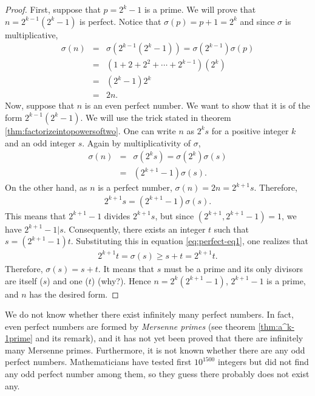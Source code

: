 \documentclass[12pt]{subfile}
\begin{document}
	\begin{proof}
		First, suppose that $p=2^k-1$ is a prime. We will prove that $n=2^{k-1}(2^k-1)$ is perfect. Notice that $\sigma(p)=p+1=2^k$ and since $\sigma$ is multiplicative,
		\begin{eqnarray*}
			\sigma(n) &=& \sigma\left(2^{k-1}(2^k-1)\right) = \sigma(2^{k-1}) \sigma(p)\\
					  &=& \left(1+2+2^2+\cdots+2^{k-1}\right) \left(2^k\right)\\
					  &=& \left(2^k-1\right) 2^k\\
					  &=& 2n.
		\end{eqnarray*}
		Now, suppose that $n$ is an even perfect number. We want to show that it is of the form $2^{k-1}(2^k-1)$. We will use the trick stated in theorem \eqref{thm:factorizeintopowersoftwo}. One can write $n$ as $2^ks$ for a positive integer $k$ and an odd integer $s$. Again by multiplicativity of $\sigma$,
		\begin{eqnarray*}
			\sigma(n) &=&  \sigma(2^k s) = \sigma(2^k)\sigma(s)\\
					  &=& \left(2^{k+1}-1\right) \sigma(s).
		\end{eqnarray*}
		On the other hand, as $n$ is a perfect number, $\sigma(n)=2n = 2^{k+1}s$. Therefore,
		\begin{align}
			2^{k+1}s = \left(2^{k+1}-1\right) \sigma(s). \label{eq:perfect-eq1}
		\end{align}
		This means that $2^{k+1}-1$ divides $2^{k+1}s$, but since $(2^{k+1}, 2^{k+1}-1)= 1$, we have $2^{k+1}-1|s$. Consequently, there exists an integer $t$ such that $s = \left(2^{k+1}-1\right) t$.  Substituting this in equation \eqref{eq:perfect-eq1}, one realizes that
		\begin{align*}
			2^{k+1}t = \sigma(s) \geq s +t = 2^{k+1}t.
		\end{align*}
		Therefore, $\sigma(s)=s+t$. It means that $s$ must be a prime and its only divisors are itself ($s$) and one ($t$) (why?). Hence $n=2^k(2^{k+1}-1)$,  $2^{k+1}-1$ is a prime, and $n$ has the desired form.
	\end{proof}
	
	\begin{remark}
		We do not know whether there exist infinitely many perfect numbers. In fact, even perfect numbers are formed by \textit{Mersenne primes} (see theorem \eqref{thm:a^k-1prime} and its remark), and it has not yet been proved that there are infinitely many Mersenne primes. Furthermore, it is not known whether there are any odd perfect numbers. Mathematicians have tested first $10^{1500}$ integers but did not find any odd perfect number among them, so they guess there probably does not exist any.
	\end{remark}
	
\end{document}
